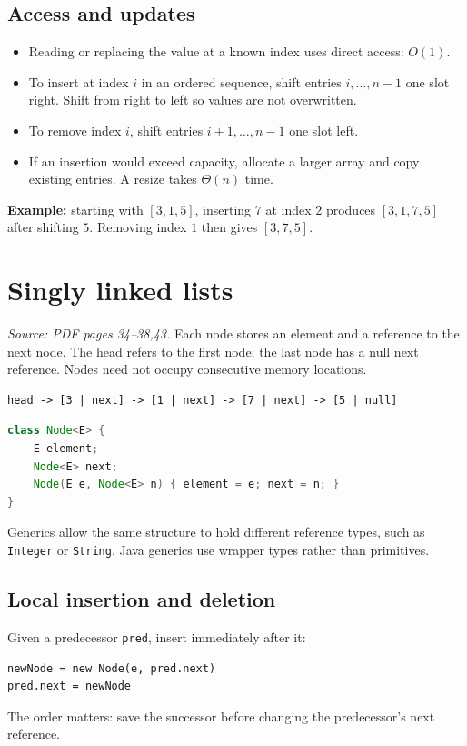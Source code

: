 \documentclass[11pt,letterpaper]{article}
\newcommand{\sourcepages}[1]{\textit{Source: PDF pages #1.}}
\newcommand{\method}[1]{\texttt{#1}}
\begin{document}
\subsection{Access and updates}
\begin{itemize}
\item Reading or replacing the value at a known index uses direct access: $O(1)$.
\item To insert at index $i$ in an ordered sequence, shift entries $i,\ldots,n-1$ one slot right. Shift from right to left so values are not overwritten.
\item To remove index $i$, shift entries $i+1,\ldots,n-1$ one slot left.
\item If an insertion would exceed capacity, allocate a larger array and copy existing entries. A resize takes $\Theta(n)$ time.
\end{itemize}
\textbf{Example:} starting with $[3,1,5]$, inserting $7$ at index $2$ produces $[3,1,7,5]$ after shifting $5$. Removing index $1$ then gives $[3,7,5]$.

\section{Singly linked lists}
\sourcepages{34--38,43}
Each node stores an element and a reference to the next node. The head refers to the first node; the last node has a null next reference. Nodes need not occupy consecutive memory locations.
\par\noindent\begin{minipage}{\linewidth}
\begin{lstlisting}
head -> [3 | next] -> [1 | next] -> [7 | next] -> [5 | null]
\end{lstlisting}
\end{minipage}\par
\par\noindent\begin{minipage}{\linewidth}
\begin{lstlisting}[language=Java]
class Node<E> {
    E element;
    Node<E> next;
    Node(E e, Node<E> n) { element = e; next = n; }
}
\end{lstlisting}
\end{minipage}\par
Generics allow the same structure to hold different reference types, such as \method{Integer} or \method{String}. Java generics use wrapper types rather than primitives.

\subsection{Local insertion and deletion}
Given a predecessor \method{pred}, insert immediately after it:
\par\noindent\begin{minipage}{\linewidth}
\begin{lstlisting}
newNode = new Node(e, pred.next)
pred.next = newNode
\end{lstlisting}
\end{minipage}\par
The order matters: save the successor before changing the predecessor's next reference.
\end{document}
